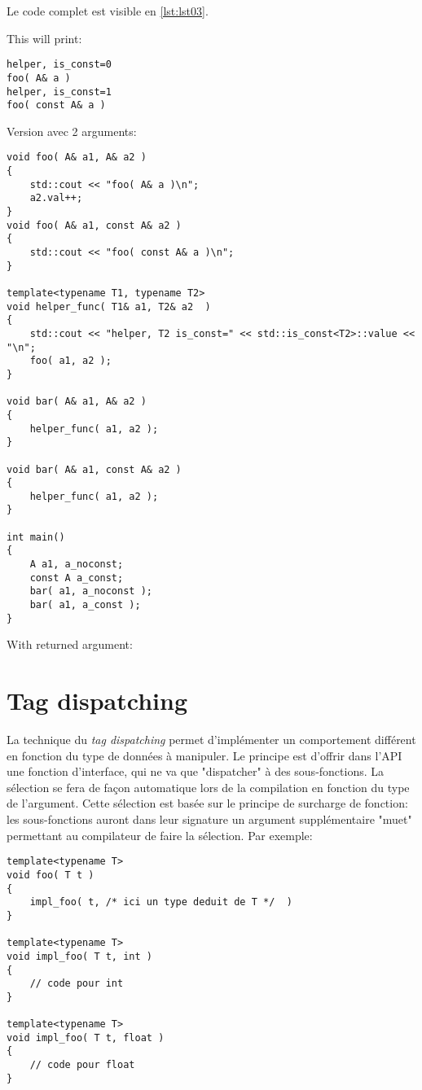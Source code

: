 \documentclass[11pt,a4paper]{article}
\begin{document}
Le code complet est visible en \ref{lst:lst03}.




This will print:
\begin{lstlisting}
helper, is_const=0
foo( A& a )
helper, is_const=1
foo( const A& a )
\end{lstlisting}

Version avec 2 arguments:

\begin{lstlisting}
void foo( A& a1, A& a2 )
{
    std::cout << "foo( A& a )\n";
    a2.val++;
}
void foo( A& a1, const A& a2 )
{
    std::cout << "foo( const A& a )\n";
}

template<typename T1, typename T2>
void helper_func( T1& a1, T2& a2  )
{
    std::cout << "helper, T2 is_const=" << std::is_const<T2>::value << "\n";
	foo( a1, a2 );
}

void bar( A& a1, A& a2 )
{
	helper_func( a1, a2 );
}

void bar( A& a1, const A& a2 )
{
	helper_func( a1, a2 );
}
 
int main()
{
    A a1, a_noconst;
    const A a_const;
    bar( a1, a_noconst );
    bar( a1, a_const );
}
\end{lstlisting}

With returned argument:


\section{Tag dispatching}

La technique du {\em tag dispatching}
permet d'implémenter un comportement différent en fonction du type de données à manipuler.
Le principe est d'offrir dans l'API une fonction d'interface, qui ne va que "dispatcher" à des sous-fonctions.
La sélection se fera de façon automatique lors de la compilation en fonction du type de l'argument.
Cette sélection est basée sur le principe de surcharge de fonction:
les sous-fonctions auront dans leur signature un argument supplémentaire "muet" permettant au compilateur de faire la sélection.
Par exemple:

\begin{lstlisting}
template<typename T>
void foo( T t )
{
	impl_foo( t, /* ici un type deduit de T */  )
}

template<typename T>
void impl_foo( T t, int )
{
	// code pour int
}

template<typename T>
void impl_foo( T t, float )
{
	// code pour float
}
\end{lstlisting}
\end{document}
